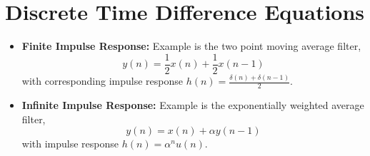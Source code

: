 \section{Discrete Time Difference Equations}
\begin{itemize}
	\item \textbf{Finite Impulse Response:} Example is the two point moving
	      average filter,
	      \[
		      y(n) = \frac{1}{2}x(n) + \frac{1}{2}x(n-1)
	      \]
	      with corresponding impulse response $h(n) = \frac{\delta(n) + \delta(n-1)}{2}$.
	\item \textbf{Infinite Impulse Response:} Example is the exponentially
	      weighted average filter,
	      \[
		      y(n) = x(n) + \alpha y(n-1)
	      \]
	      with impulse response $h(n) = \alpha^n u(n)$.
\end{itemize}
